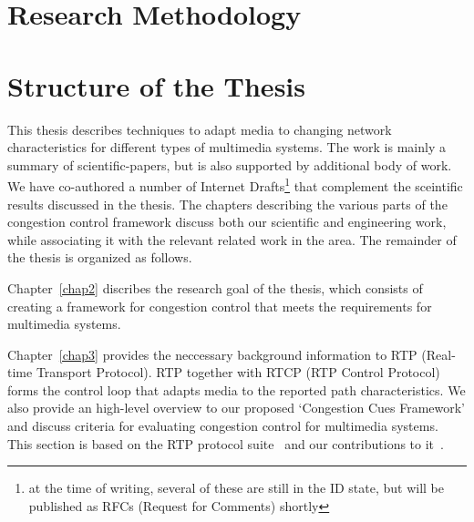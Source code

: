 

\section{Research Methodology}

\section{Structure of the Thesis}

This thesis describes techniques to adapt media to changing network
characteristics for different types of multimedia systems. The work is mainly
a summary of scientific-papers, but is also supported by additional body of
work. We have co-authored a number of Internet Drafts\footnote{at the time of
writing, several of these are still in the ID state, but will be published as
RFCs (Request for Comments) shortly} that complement the  sceintific results
discussed in the thesis. The chapters describing the various parts of the
congestion control framework discuss both our scientific and engineering work,
while associating it with the relevant related work in the area. The remainder
of the thesis is organized as follows.

Chapter~\ref{chap2} discribes the research goal of the thesis, which consists
of creating a framework for congestion control that meets the requirements for
multimedia systems.


Chapter~\ref{chap3} provides the neccessary background information to RTP
(Real-time Transport Protocol). RTP together with RTCP (RTP Control Protocol)
forms the control loop that adapts media to the reported path characteristics.
We also provide an high-level overview to our proposed `Congestion Cues
Framework' and discuss criteria for evaluating congestion control for
multimedia systems. This section is based on the RTP protocol
suite~\cite{rfc3550, rfc4585, rfc3611, rfc5104, rfc5506} and our contributions
to it~\cite{draft.rmcat.evaluate, draft.xr.discard.rle, draft.xr.jb}.


